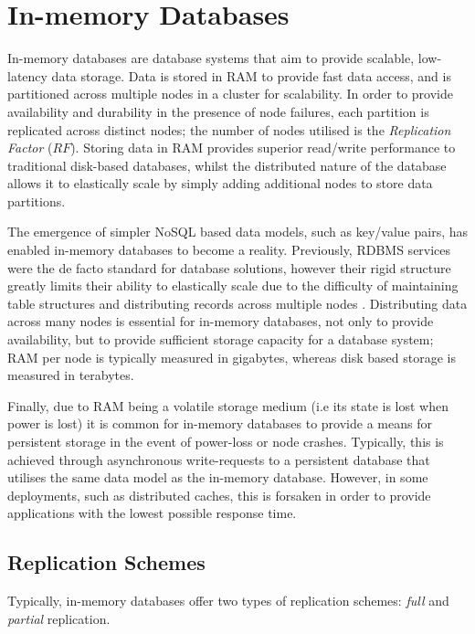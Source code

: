 \section{In-memory Databases}
In-memory databases \citep{Infinispan, Hazelcast, GridGain, OracleCoherence, PivotalGemFire} are database systems that aim to provide scalable, low-latency data storage.  Data is stored in RAM to provide fast data access, and is partitioned across multiple nodes in a cluster for scalability.  In order to provide availability and durability in the presence of node failures, each partition is replicated across distinct nodes; the number of nodes utilised is the \emph{Replication Factor} ($RF$).  Storing data in RAM provides superior read/write performance to traditional disk-based databases, whilst the distributed nature of the database allows it to elastically scale by simply adding additional nodes to store data partitions.  

The emergence of simpler NoSQL based data models, such as key/value pairs, has enabled in-memory databases to become a reality.  Previously, RDBMS services were the de facto standard for database solutions, however their rigid structure greatly limits their ability to elastically scale due to the difficulty of maintaining table structures and distributing records across multiple nodes \citep{Cattell:2011:SSN:1978915.1978919, Cooper:2010:BCS:1807128.1807152}. Distributing data across many nodes is essential for in-memory databases, not only to provide availability, but to provide sufficient storage capacity for a database system; RAM per node is typically measured in gigabytes, whereas disk based storage is measured in terabytes.  

Finally, due to RAM being a volatile storage medium (i.e its state is lost when power is lost) it is common for in-memory databases to provide a means for persistent storage in the event of power-loss or node crashes.  Typically, this is achieved through asynchronous write-requests to a persistent database that utilises the same data model as the in-memory database.  However, in some deployments, such as distributed caches, this is forsaken in order to provide applications with the lowest possible response time.  
    
    \subsection{Replication Schemes}\label{replication_schemes}
	Typically, in-memory databases offer two types of replication schemes: \emph{full} and \emph{partial} replication.  
	
